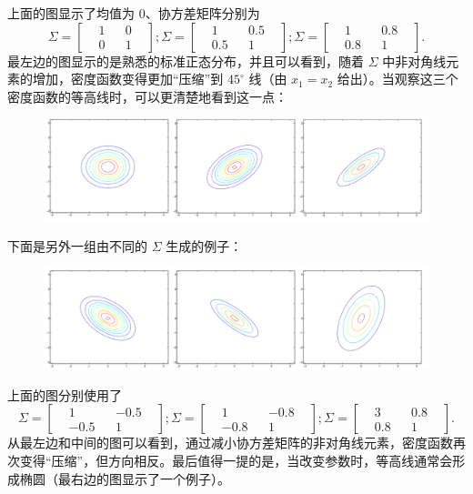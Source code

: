 上面的图显示了均值为 0、协方差矩阵分别为
\[
    \Sigma = \begin{bmatrix} &1& &0& \\ &0& &1& \end{bmatrix}; \Sigma = \begin{bmatrix} &1& &0.5& \\ &0.5& &1& \end{bmatrix}; \Sigma = \begin{bmatrix} &1& &0.8& \\ &0.8& &1& \end{bmatrix}.
\]
最左边的图显示的是熟悉的标准正态分布，并且可以看到，随着 $\Sigma$ 中非对角线元素的增加，密度函数变得更加“压缩”到 $45^\circ$ 线（由 $x_1 = x_2$ 给出）。当观察这三个密度函数的等高线时，可以更清楚地看到这一点：

\begin{figure}[H]
    \centering
    \includegraphics[width=1.0\linewidth]{figs/gaussian_contour1.png}
\end{figure}

下面是另外一组由不同的 $\Sigma$ 生成的例子：

\begin{figure}[H]
    \centering
    \includegraphics[width=1.0\linewidth]{figs/gaussian_contour2.png}
\end{figure}

上面的图分别使用了
\[
    \Sigma = \begin{bmatrix} &1& &-0.5& \\ &-0.5& &1& \end{bmatrix}; \Sigma = \begin{bmatrix} &1& &-0.8& \\ &-0.8& &1& \end{bmatrix}; \Sigma = \begin{bmatrix} &3& &0.8& \\ &0.8& &1& \end{bmatrix}.
\]
从最左边和中间的图可以看到，通过减小协方差矩阵的非对角线元素，密度函数再次变得“压缩”，但方向相反。最后值得一提的是，当改变参数时，等高线通常会形成椭圆（最右边的图显示了一个例子）。

